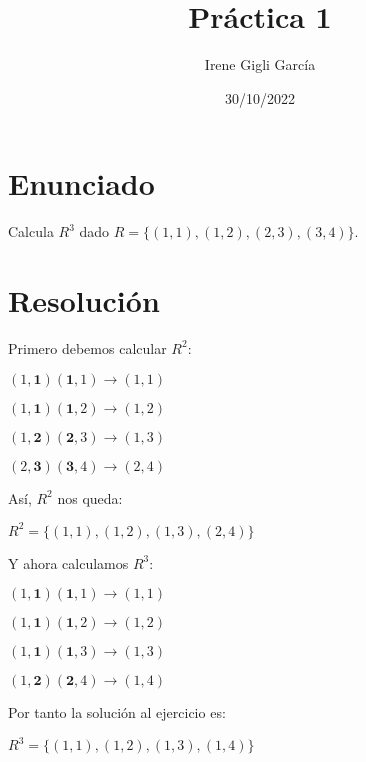 \documentclass[11pt]{article}
\title{\textbf{Práctica 1}}
\author{Irene Gigli García}
\date{30/10/2022}
\begin{document}
\maketitle

\section{Enunciado}

\begin{flushleft}
Calcula $R^3$ dado $R=\{(1,1),(1,2),(2,3),(3,4)\}$.
\end{flushleft}

\section{Resolución}

\begin{flushleft}
Primero debemos calcular $R^2$:
\end{flushleft}

\begin{center}
$(1,\textbf{1}) (\textbf{1},1) \rightarrow (1,1)$

$(1,\textbf{1}) (\textbf{1},2) \rightarrow (1,2)$

$(1,\textbf{2}) (\textbf{2},3) \rightarrow (1,3)$

$(2,\textbf{3}) (\textbf{3},4) \rightarrow (2,4)$

\end{center}

\begin{flushleft}
Así, $R^2$ nos queda:
\end{flushleft}

\begin{center}
$R^2=\{(1,1),(1,2),
(1,3),(2,4)\}$
\end{center}

\begin{flushleft}
Y ahora calculamos $R^3$:
\end{flushleft}

\begin{center}
$(1,\textbf{1}) (\textbf{1},1) \rightarrow (1,1)$

$(1,\textbf{1}) (\textbf{1},2) \rightarrow (1,2)$

$(1,\textbf{1}) (\textbf{1},3) \rightarrow (1,3)$

$(1,\textbf{2}) (\textbf{2},4) \rightarrow (1,4)$
\end{center}

\begin{flushleft}
Por tanto la solución al ejercicio es:
\end{flushleft}

\begin{center}
$R^3=\{(1,1),(1,2),
(1,3),(1,4)\}$
\end{center}
\end{document}
